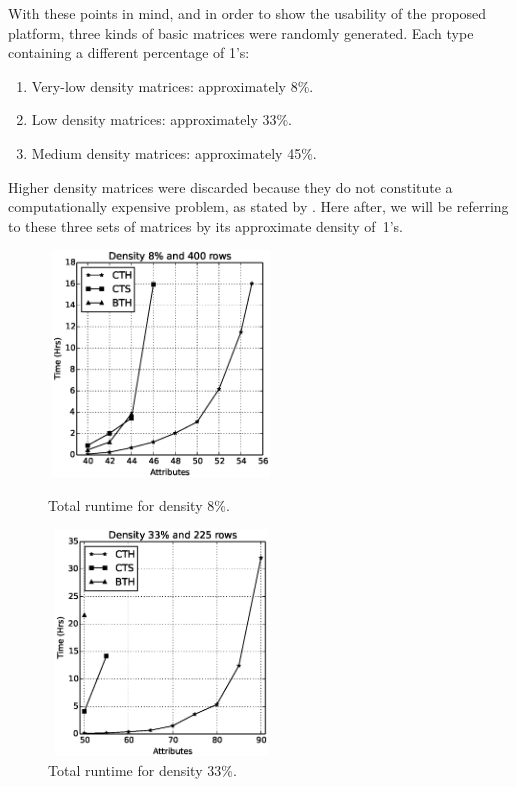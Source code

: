 \documentclass[authoryear,11pt]{elsarticle}
\begin{document}
	With these points in mind, and in order to show the usability of the proposed platform, 
	three kinds of basic matrices were randomly generated. Each type containing a different percentage of 1's: 
	\begin{enumerate}
		\item Very-low density matrices: approximately 8\%.
		\item Low density matrices: approximately 33\%.
		\item Medium density matrices: approximately 45\%.
	\end{enumerate}
	
	Higher density matrices were discarded because they do not constitute a computationally expensive problem, 
	as stated by \cite{Rojas12}. Here after, we will be referring to these three sets of matrices by its 
	approximate density of~1's.
	
	\begin{figure}[htb]
	\centering
	\begin{minipage}{.5\textwidth}
	  \centering
	   \includegraphics[width=6cm , height=6cm]{low_density.eps}
	  \caption{Total runtime for density 8\%.}
	  \label{fig:result1}
	\end{minipage}%
	\begin{minipage}{.5\textwidth}
	  \centering
	   \includegraphics[width=6cm , height=6cm]{med_density.eps}
	  \caption{Total runtime for density 33\%.}
	  \label{fig:result2}
	\end{minipage}
	\end{figure}
	
\end{document}

